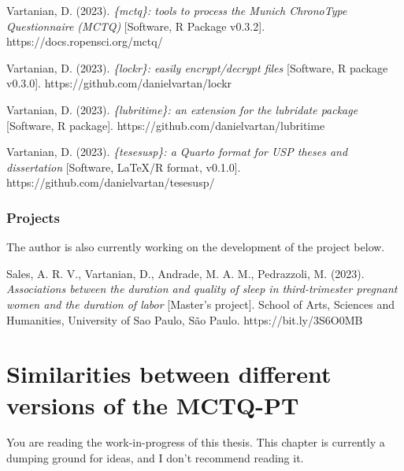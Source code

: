 \documentclass[
  12pt,
  a4paper,
  oneside]{tesesusp}
\begin{document}
Vartanian, D. (2023). \emph{\{mctq\}: tools to process the Munich
ChronoType Questionnaire (MCTQ)} {[}Software, R Package v0.3.2{]}.
https://docs.ropensci.org/mctq/

Vartanian, D. (2023). \emph{\{lockr\}: easily encrypt/decrypt files}
{[}Software, R package v0.3.0{]}. https://github.com/danielvartan/lockr

Vartanian, D. (2023). \emph{\{lubritime\}: an extension for the
lubridate package} {[}Software, R package{]}.
https://github.com/danielvartan/lubritime

Vartanian, D. (2023). \emph{\{tesesusp\}: a Quarto format for USP theses
and dissertation} {[}Software, LaTeX/R format, v0.1.0{]}.
https://github.com/danielvartan/tesesusp/

\hypertarget{projects}{%
\subsection{Projects}\label{projects}}

The author is also currently working on the development of the project
below.

Sales, A. R. V., Vartanian, D., Andrade, M. A. M., Pedrazzoli, M.
(2023). \emph{Associations between the duration and quality of sleep in
third-trimester pregnant women and the duration of labor} {[}Master's
project{]}. School of Arts, Sciences and Humanities, University of Sao
Paulo, São Paulo. https://bit.ly/3S6O0MB

\hypertarget{similarities-between-different-versions-of-the-mctq-pt}{%
\chapter{Similarities between different versions of the
MCTQ-PT}\label{similarities-between-different-versions-of-the-mctq-pt}}

\begin{tcolorbox}[enhanced jigsaw, breakable, colback=white, colbacktitle=quarto-callout-important-color!10!white, leftrule=.75mm, left=2mm, toprule=.15mm, opacityback=0, rightrule=.15mm, title=\textcolor{quarto-callout-important-color}{\faExclamation}\hspace{0.5em}{Important}, opacitybacktitle=0.6, bottomtitle=1mm, titlerule=0mm, toptitle=1mm, coltitle=black, colframe=quarto-callout-important-color-frame, bottomrule=.15mm, arc=.35mm]

You are reading the work-in-progress of this thesis. This chapter is
currently a dumping ground for ideas, and I don't recommend reading it.

\end{tcolorbox}
\end{document}
